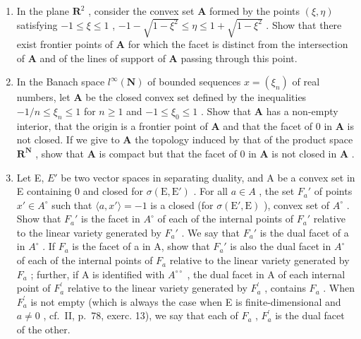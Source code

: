 \begin{enumerate}
\def\labelenumi{\arabic{enumi})}
\setcounter{enumi}{3}
\item
  In the plane \(\mathbf{R}^2\) , consider the convex set \(\mathbf{A}\) formed by the points \((\xi, \eta)\) satisfying \(-1 \leqslant \xi \leqslant 1\) , \(-1 - \sqrt{1 - \xi^2} \leqslant \eta \leqslant 1 + \sqrt{1 - \xi^2}\) . Show that there exist frontier points of \(\mathbf{A}\) for which the facet is distinct from the intersection of \(\mathbf{A}\) and of the lines of support of \(\mathbf{A}\) passing through this point.
\item
  In the Banach space \(l^{\infty}(\mathbf{N})\) of bounded sequences \(x = (\xi_n)\) of real numbers, let \(\mathbf{A}\) be the closed convex set defined by the inequalities \(-1 / n \leqslant \xi_n \leqslant 1\) for \(n \geqslant 1\) and \(-1 \leqslant \xi_0 \leqslant 1\) . Show that \(\mathbf{A}\) has a non-empty interior, that the origin is a frontier point of \(\mathbf{A}\) and that the facet of 0 in \(\mathbf{A}\) is not closed. If we give to \(\mathbf{A}\) the topology induced by that of the product space \(\mathbf{R}^{\mathbf{N}}\) , show that \(\mathbf{A}\) is compact but that the facet of 0 in \(\mathbf{A}\) is not closed in \(\mathbf{A}\) .
\item
  Let E, \(E'\) be two vector spaces in separating duality, and A be a convex set in E containing 0 and closed for \(\sigma(\mathrm{E}, \mathrm{E}')\) . For all \(a \in A\) , the set \(F_{a}'\) of points \(x' \in A^{\circ}\) such that \(\langle a, x' \rangle = -1\) is a closed (for \(\sigma(\mathrm{E}', \mathrm{E})\) ), convex set of \(A^{\circ}\) . Show that \(F_{a}'\) is the facet in \(A^{\circ}\) of each of the internal points of \(F_{a}'\) relative to the linear variety generated by \(F_{a}'\) . We say that \(F_{a}'\) is the dual facet of a in \(A^{\circ}\) . If \(F_{a}\) is the facet of a in A, show that \(F_{a}'\) is also the dual facet in \(A^{\circ}\) of each of the internal points of \(F_{a}\) relative to the linear variety generated by \(F_{a}\) ; further, if A is identified with \(A^{\circ\circ}\) , the dual facet in A of each internal point of \(F_{a}^{\prime}\) relative to the linear variety generated by \(F_{a}^{\prime}\) , contains \(F_{a}\) . When \(F_{a}^{\prime}\) is not empty (which is always the case when E is finite-dimensional and \(a \neq 0\) , cf.~II, p.~78, exerc. 13), we say that each of \(F_{a}\) , \(F_{a}^{\prime}\) is the dual facet of the other.
\end{enumerate}

